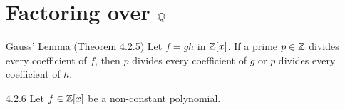 \documentclass[12pt]{article}
\begin{document}
\section*{Factoring over $\mathbb{Q}$}{
}
{
	\begin{statementblock}{Gauss' Lemma (Theorem 4.2.5)}
		Let $f=gh$ in $\mathbb{Z}[x]$.  If a prime $p\in\mathbb{Z}$ divides every coefficient of $f$, then $p$ divides every coefficient of $g$ or $p$ divides every coefficient of $h$.
	\end{statementblock}
}
{
	\begin{thm}{4.2.6}
		Let $f\in \mathbb{Z}[x]$ be a non-constant polynomial.
	\end{thm}
}
\end{document}
